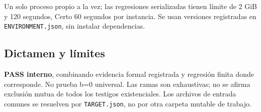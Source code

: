 Un solo proceso propio a la vez; las regresiones serializadas tienen
límite de 2 GiB y 120 segundos, Certo 60 segundos por instancia. Se usan
versiones registradas en \texttt{ENVIRONMENT.json}, sin instalar
dependencias.

\subsection{Dictamen y límites}\label{dictamen-y-luxedmites}

\textbf{PASS interno}, combinando evidencia formal registrada y
regresión finita donde corresponde. No prueba b=0 universal. Las ramas
son exhaustivas; no se afirma exclusión mutua de todos los testigos
existenciales. Los archivos de entrada comunes se resuelven por
\texttt{TARGET.json}, no por otra carpeta mutable de trabajo.
